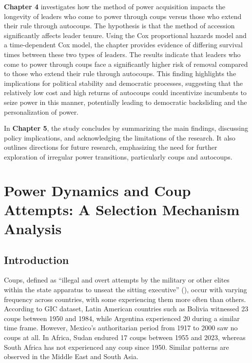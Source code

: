 \documentclass[
  12pt,
]{report}
\begin{document}
\textbf{Chapter 4} investigates how the method of power acquisition
impacts the longevity of leaders who come to power through coups versus
those who extend their rule through autocoups. The hypothesis is that
the method of accession significantly affects leader tenure. Using the
Cox proportional hazards model and a time-dependent Cox model, the
chapter provides evidence of differing survival times between these two
types of leaders. The results indicate that leaders who come to power
through coups face a significantly higher risk of removal compared to
those who extend their rule through autocoups. This finding highlights
the implications for political stability and democratic processes,
suggesting that the relatively low cost and high returns of autocoups
could incentivize incumbents to seize power in this manner, potentially
leading to democratic backsliding and the personalization of power.

In \textbf{Chapter 5}, the study concludes by summarizing the main
findings, discussing policy implications, and acknowledging the
limitations of the research. It also outlines directions for future
research, emphasizing the need for further exploration of irregular
power transitions, particularly coups and autocoups.

\chapter{Power Dynamics and Coup Attempts: A Selection Mechanism
Analysis}\label{sec-chapter2}

\section{Introduction}\label{introduction-1}

Coups, defined as ``illegal and overt attempts by the military or other
elites within the state apparatus to unseat the sitting executive''
(), occur
with varying frequency across countries, with some experiencing them
more often than others. According to GIC dataset, Latin American
countries such as Bolivia witnessed 23 coups between 1950 and 1984,
while Argentina experienced 20 during a similar time frame. However,
Mexico's authoritarian period from 1917 to 2000 saw no coups at all. In
Africa, Sudan endured 17 coups between 1955 and 2023, whereas South
Africa has not experienced any coup since 1950. Similar patterns are
observed in the Middle East and South Asia.
\end{document}
